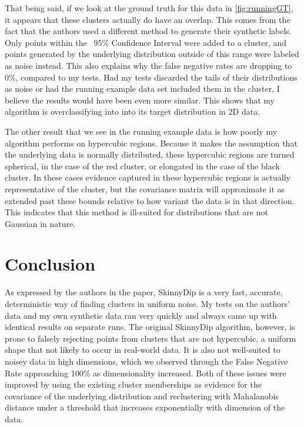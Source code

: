 \documentclass{sig-alternate-05-2015}
\begin{document}
That being said, if we look at the ground truth for this data in \ref{fig:runningGT}, it appears that these clusters actually do have an overlap. This comes from the fact that the authors used a different method to generate their synthetic labels. Only points within the ~95\% Confidence Interval were added to a cluster, and points generated by the underlying distribution outside of this range were labeled as noise instead. This also explains why the false negative rates are dropping to 0\%, compared to my tests. Had my tests discarded the tails of their distributions as noise or had the running example data set included them in the cluster, I believe the results would have been even more similar. This shows that my algorithm is overclassifying into into its target distribution in 2D data.

The other result that we see in the running example data is how poorly my algorithm performs on hypercubic regions. Because it makes the assumption that the underlying data is normally distributed, these hypercubic regions are turned spherical, in the case of the red cluster, or elongated in the case of the black cluster. In these cases evidence captured in these hypercubic regions is actually representative of the cluster, but the covariance matrix will approximate it as extended past these bounds relative to how variant the data is in that direction. This indicates that this method is ill-suited for distributions that are not Gaussian in nature.

\section{Conclusion}
As expressed by the authors in the paper, SkinnyDip is a very fast, accurate, deterministic way of finding clusters in uniform noise. My tests on the authors' data and my own synthetic data ran very quickly and always came up with identical results on separate runs. The original SkinnyDip algorithm, however, is prone to falsely rejecting points from clusters that are not hypercubic, a uniform shape that not likely to occur in real-world data. It is also not well-suited to noisey data in high dimensions, which we observed through the False Negative Rate approaching 100\% as dimensionality increased. Both of these issues were improved by using the existing cluster memberships as evidence for the covariance of the underlying distribution and reclustering with Mahalanobis distance under a threshold that increases exponentially with dimension of the data.
\end{document}
